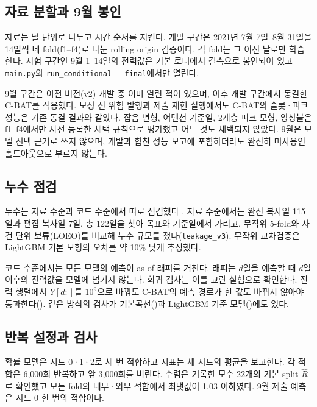 \subsection{자료 분할과 9월 봉인}

자료는 날 단위로 나누고 시간 순서를 지킨다. 개발 구간은 2021년 7월 7일--8월 31일을 14일씩 네 fold(f1--f4)로 나눈 rolling origin 검증이다. 각 fold는 그 이전 날로만 학습한다. 시험 구간인 9월 1--14일의 전력값은 기본 로더에서 결측으로 봉인되어 있고 \texttt{main.py}와 \texttt{run\_conditional -{}-final}에서만 열린다.

9월 구간은 이전 버전(v2) 개발 중 이미 열린 적이 있으며, 이후 개발 구간에서 동결한 C-BAT를 적용했다. 보정 전 위험 발행과 제출 재현 실행에서도 C-BAT의 슬롯·피크 성능은 기존 동결 결과와 같았다. 잡음 변형, 어텐션 기준일, 2계층 피크 모형, 앙상블은 f1--f4에서만 사전 등록한 채택 규칙으로 평가했고 어느 것도 채택되지 않았다. 9월은 모델 선택 근거로 쓰지 않으며, 개발과 합친 성능 보고에 포함하더라도 완전히 미사용인 홀드아웃으로 부르지 않는다.

\subsection{누수 점검}

누수는 자료 수준과 코드 수준에서 따로 점검했다 \citep{kapoor2023leakage}. 자료 수준에서는 완전 복사일 115일과 편집 복사일 7일, 총 122일을 찾아 목표와 기준일에서 가리고, 무작위 5-fold와 사건 단위 보류(LOEO)를 비교해 누수 규모를 쟀다(\texttt{leakage\_v3}). 무작위 교차검증은 LightGBM 기본 모형의 오차를 약 10\% 낮게 추정했다.

코드 수준에서는 모든 모델의 예측이 as-of 래퍼를 거친다. 래퍼는 $d$일을 예측할 때 $d$일 이후의 전력값을 모델에 넘기지 않는다. 회귀 검사는 이를 교란 실험으로 확인한다. 전력 행렬에서 $Y[d{:}]$를 $10^9$으로 바꿔도 C-BAT의 예측 경로가 한 값도 바뀌지 않아야 통과한다(). 같은 방식의 검사가 기본곡선()과 LightGBM 기준 모델()에도 있다.

\subsection{반복 설정과 검사}

확률 모델은 시드 0·1·2로 세 번 적합하고 지표는 세 시드의 평균을 보고한다. 각 적합은 6,000회 반복하고 앞 3,000회를 버린다. 수렴은 기록한 모수 22개의 기본 split-$\widehat R$ \citep{gelman1992rhat,vehtari2021rhat}로 확인했고 모든 fold의 내부·외부 적합에서 최댓값이 1.03 이하였다. 9월 제출 예측은 시드 0 한 번의 적합이다.


